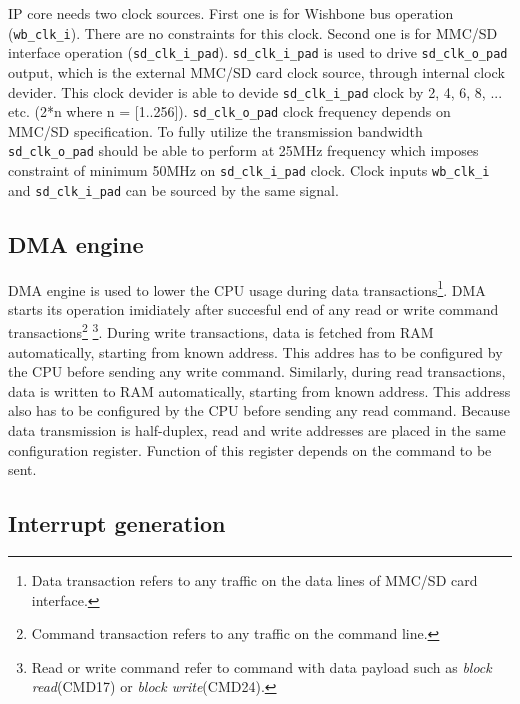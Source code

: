     IP core needs two clock sources. First one is for Wishbone bus operation (\texttt{wb\_clk\_i}). There are no constraints for this clock. 
    Second one is for MMC/SD interface operation (\texttt{sd\_clk\_i\_pad}). 
    \texttt{sd\_clk\_i\_pad} is used to drive \texttt{sd\_clk\_o\_pad} output, which is the external MMC/SD card clock source, through internal
    clock devider. This clock devider is able to devide \texttt{sd\_clk\_i\_pad} clock by 2, 4, 6, 8, ... etc. (2*n where n = [1..256]).
    \texttt{sd\_clk\_o\_pad} clock frequency depends on MMC/SD specification. To fully utilize the transmission bandwidth \texttt{sd\_clk\_o\_pad}
    should be able to perform at 25MHz frequency which imposes constraint of minimum 50MHz on \texttt{sd\_clk\_i\_pad} clock. 
    Clock inputs \texttt{wb\_clk\_i} and \texttt{sd\_clk\_i\_pad} can be sourced by the same signal.
    
    \subsection{DMA engine}
    \label{sec:dma}
    
    DMA engine is used to lower the CPU usage during data transactions\footnote{Data transaction refers to any traffic on the data lines of MMC/SD card interface.}.
    DMA starts its operation imidiately after succesful end of any read or write command transactions\footnote{Command transaction refers to any traffic on the command line.}
    \footnote{Read or write command refer to command with data payload such as \textit{block read}(CMD17) or \textit{block write}(CMD24).}.
    During write transactions, data is fetched from RAM automatically, starting from known address. This addres has to be configured by the CPU before sending any write command. 
    Similarly, during read transactions, data is written to RAM automatically, starting from known address. 
    This address also has to be configured by the CPU before sending any read command. Because data transmission is half-duplex, 
    read and write addresses are placed in the same configuration register. Function of this register depends on the command to be sent.
    
    \subsection{Interrupt generation}
    \label{sec:interrupt}
    
